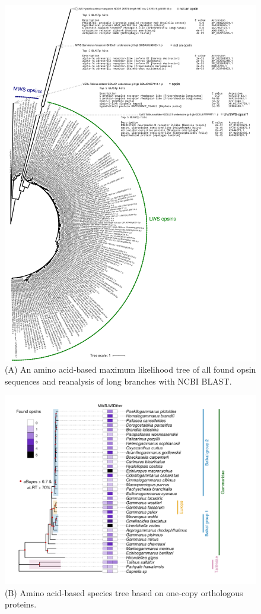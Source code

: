 \documentclass{article}
\begin{document}
\begin{figure}[H] 
	\vskip -18mm
	\includegraphics[scale=0.85]{FigS2a_opsin_tree.pdf}
	\caption{(A) An amino acid-based maximum likelihood tree of all found opsin sequences and reanalysis of long branches with NCBI BLAST.} 
\end{figure}

\begin{figure}[H] 
	\ContinuedFloat
	\includegraphics[scale=0.85]{FigS2_aa_tree.png}
	\caption{(B) Amino acid-based species tree based on one-copy orthologous proteins.} 
\end{figure}
\end{document}
